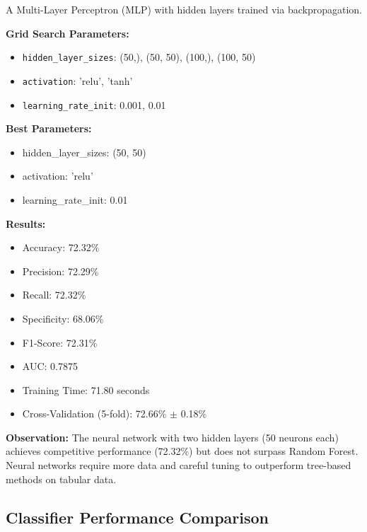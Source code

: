 \documentclass[12pt,man]{apa7}
\begin{document}
A Multi-Layer Perceptron (MLP) with hidden layers trained via backpropagation.

\textbf{Grid Search Parameters:}
\begin{itemize}
    \item \texttt{hidden\_layer\_sizes}: (50,), (50, 50), (100,), (100, 50)
    \item \texttt{activation}: 'relu', 'tanh'
    \item \texttt{learning\_rate\_init}: 0.001, 0.01
\end{itemize}

\textbf{Best Parameters:}
\begin{itemize}
    \item hidden\_layer\_sizes: (50, 50)
    \item activation: 'relu'
    \item learning\_rate\_init: 0.01
\end{itemize}

\textbf{Results:}
\begin{itemize}
    \item Accuracy: 72.32\%
    \item Precision: 72.29\%
    \item Recall: 72.32\%
    \item Specificity: 68.06\%
    \item F1-Score: 72.31\%
    \item AUC: 0.7875
    \item Training Time: 71.80 seconds
    \item Cross-Validation (5-fold): 72.66\% $\pm$ 0.18\%
\end{itemize}

\textbf{Observation:} The neural network with two hidden layers (50 neurons each) achieves competitive performance (72.32\%) but does not surpass Random Forest. Neural networks require more data and careful tuning to outperform tree-based methods on tabular data.

\subsection{Classifier Performance Comparison}
\end{document}
